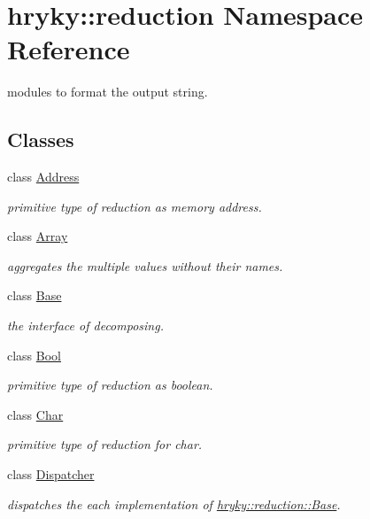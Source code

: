 \hypertarget{namespacehryky_1_1reduction}{\section{hryky\-:\-:reduction Namespace Reference}
\label{namespacehryky_1_1reduction}
}


modules to format the output string.  


\subsection*{Classes}
\begin{DoxyCompactItemize}
\item 
class \hyperlink{classhryky_1_1reduction_1_1_address}{Address}
\begin{DoxyCompactList}\small\item\em primitive type of reduction as memory address. \end{DoxyCompactList}\item 
class \hyperlink{classhryky_1_1reduction_1_1_array}{Array}
\begin{DoxyCompactList}\small\item\em aggregates the multiple values without their names. \end{DoxyCompactList}\item 
class \hyperlink{classhryky_1_1reduction_1_1_base}{Base}
\begin{DoxyCompactList}\small\item\em the interface of decomposing. \end{DoxyCompactList}\item 
class \hyperlink{classhryky_1_1reduction_1_1_bool}{Bool}
\begin{DoxyCompactList}\small\item\em primitive type of reduction as boolean. \end{DoxyCompactList}\item 
class \hyperlink{classhryky_1_1reduction_1_1_char}{Char}
\begin{DoxyCompactList}\small\item\em primitive type of reduction for char. \end{DoxyCompactList}\item 
class \hyperlink{classhryky_1_1reduction_1_1_dispatcher}{Dispatcher}
\begin{DoxyCompactList}\small\item\em dispatches the each implementation of \hyperlink{classhryky_1_1reduction_1_1_base}{hryky\-::reduction\-::\-Base}. \end{DoxyCompactList}\item 

\end{DoxyCompactItemize}
